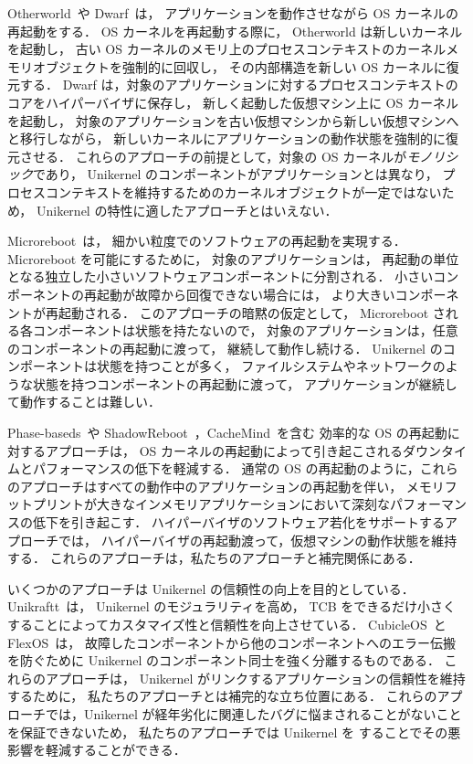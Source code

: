 Otherworld~\cite{DepoutovitchEtAl-otherworld}や Dwarf~\cite{TeradaEtAl-Dwarf}は，
アプリケーションを動作させながら OS カーネルの再起動をする．
OS カーネルを再起動する際に，
Otherworld は新しいカーネルを起動し，
古い OS カーネルのメモリ上のプロセスコンテキストのカーネルメモリオブジェクトを強制的に回収し，
その内部構造を新しい OS カーネルに復元する．
Dwarf は，対象のアプリケーションに対するプロセスコンテキストのコアをハイパーバイザに保存し，
新しく起動した仮想マシン上に OS カーネルを起動し，
対象のアプリケーションを古い仮想マシンから新しい仮想マシンへと移行しながら，
新しいカーネルにアプリケーションの動作状態を強制的に復元させる．
これらのアプローチの前提として，対象の OS カーネルが\emph{モノリシック}であり，
Unikernel のコンポーネントがアプリケーションとは異なり，
プロセスコンテキストを維持するためのカーネルオブジェクトが一定ではないため，
Unikernel の特性に適したアプローチとはいえない．


Microreboot~\cite{CandeaEtAl-Microreboot}は，
細かい粒度でのソフトウェアの再起動を実現する．
Microreboot を可能にするために，
対象のアプリケーションは，
再起動の単位となる独立した小さいソフトウェアコンポーネントに分割される．
小さいコンポーネントの再起動が故障から回復できない場合には，
より大きいコンポーネントが再起動される．
このアプローチの暗黙の仮定として，
Microreboot される各コンポーネントは状態を持たないので，
対象のアプリケーションは，任意のコンポーネントの再起動に渡って，
継続して動作し続ける．
Unikernel のコンポーネントは状態を持つことが多く，
ファイルシステムやネットワークのような状態を持つコンポーネントの再起動に渡って，
アプリケーションが継続して動作することは難しい．

Phase-baseds~\cite{YamakitaEtAl-PBR}や ShadowReboot~\cite{YamadaEtAl-ShadowR}，CacheMind~\cite{KouraiEtAl-cachemind}を含む
効率的な OS の再起動に対するアプローチは，
OS カーネルの再起動によって引き起こされるダウンタイムとパフォーマンスの低下を軽減する．
通常の OS の再起動のように，これらのアプローチはすべての動作中のアプリケーションの再起動を伴い，
メモリフットプリントが大きなインメモリアプリケーションにおいて深刻なパフォーマンスの低下を引き起こす．
ハイパーバイザのソフトウェア若化をサポートするアプローチでは，
ハイパーバイザの再起動渡って，仮想マシンの動作状態を維持する．
これらのアプローチは，私たちのアプローチと補完関係にある．

いくつかのアプローチは Unikernel の信頼性の向上を目的としている．
Unikraftt~\cite{KuenzerEtAl-Unikraft}は，
Unikernel のモジュラリティを高め，
TCB をできるだけ小さくすることによってカスタマイズ性と信頼性を向上させている．
CubicleOS~\cite{SartakovEtAl-ASPLOS21}と FlexOS~\cite{LefeuvreEtAl-FlexOS}は，
故障したコンポーネントから他のコンポーネントへのエラー伝搬を防ぐために
Unikernel のコンポーネント同士を強く分離するものである．
これらのアプローチは，
Unikernel がリンクするアプリケーションの信頼性を維持するために，
私たちのアプローチとは補完的な立ち位置にある．
これらのアプローチでは，Unikernel が経年劣化に関連したバグに悩まされることがないことを保証できないため，
私たちのアプローチでは Unikernel を \rr することでその悪影響を軽減することができる．


